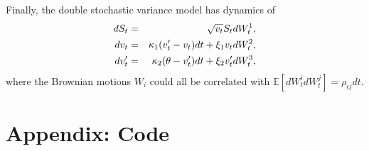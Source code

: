 \documentclass[11pt,reqno,final]{amsart}
\begin{document}
Finally, the double stochastic variance model has dynamics of
\begin{eqnarray}
dS_t &=& \sqrt{v_t} S_t d W_t^1, \notag \\
dv_t &=& \kappa_1 (v_t' - v_t) dt + \xi_1 v_t dW_t^2, \\
dv_t' &=& \kappa_2 (\theta - v_t') dt + \xi_2 v_t' dW_t^3, \notag \\
\end{eqnarray}
where the Brownian motions $W_i$ could all be correlated with $\mathbb{E}[dW_t^i dW_t^j]=\rho_{ij} dt$.
%
%
\newpage


%
%
\newpage
\section*{Appendix: Code}

\end{document}
